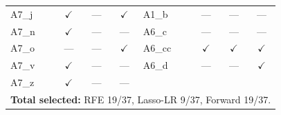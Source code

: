 \begin{table}[H]
\begin{tabular}{l c c c | l c c c}
A7\_j & $\checkmark$ & ---          & $\checkmark$ & A1\_b   & ---          & ---          & ---\\
A7\_n & $\checkmark$ & ---          & ---          & A6\_c   & ---          & ---          & ---\\
A7\_o & ---          & ---          & $\checkmark$ & A6\_cc  & $\checkmark$ & $\checkmark$ & $\checkmark$\\
A7\_v & $\checkmark$ & ---          & ---          & A6\_d   & ---          & ---          & $\checkmark$\\
A7\_z & $\checkmark$ & ---          & ---          & \multicolumn{4}{l}{}\\
\midrule
\multicolumn{8}{l}{\textbf{Total selected:} RFE 19/37, Lasso-LR 9/37, Forward 19/37.}\\
\bottomrule
\end{tabular}
\end{table}

